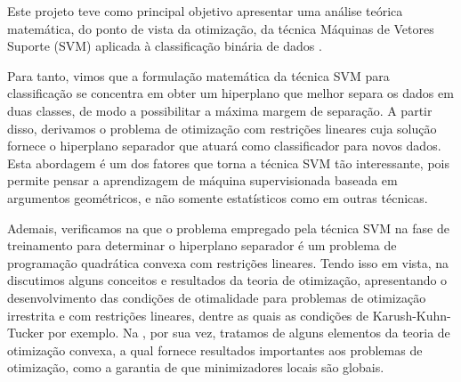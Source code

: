 \documentclass[12pt,a4paper]{scrartcl}
\theoremstyle{definition}%
\begin{document}
Este projeto teve como principal objetivo apresentar uma análise teórica matemática, do ponto de vista da otimização, da técnica Máquinas de Vetores Suporte (SVM) aplicada à classificação binária de dados \cite{Evelin2017,Faisal2019}. 




Para tanto, vimos que a formulação matemática da técnica SVM para classificação se concentra em obter um hiperplano que melhor separa os dados em duas classes, de modo a possibilitar a máxima margem de separação. A partir disso, derivamos o problema de otimização com restrições lineares cuja solução fornece o hiperplano separador que atuará como classificador para novos dados. Esta abordagem é um dos fatores que torna a técnica SVM tão interessante, pois permite pensar a aprendizagem de máquina supervisionada baseada em argumentos geométricos, e não somente estatísticos como em outras técnicas.

Ademais, verificamos na  que o problema empregado pela técnica SVM na fase de treinamento para determinar o hiperplano separador é um problema de programação quadrática convexa com restrições lineares. Tendo isso em vista, na  discutimos alguns conceitos e resultados da teoria de otimização, apresentando o desenvolvimento das condições de otimalidade para problemas de otimização irrestrita e com restrições lineares, dentre as quais as condições de Karush-Kuhn-Tucker por exemplo. Na , por sua vez, tratamos de alguns elementos da teoria de otimização convexa, a qual fornece resultados importantes aos problemas de otimização, como a garantia de que minimizadores locais são globais. 
\end{document}
